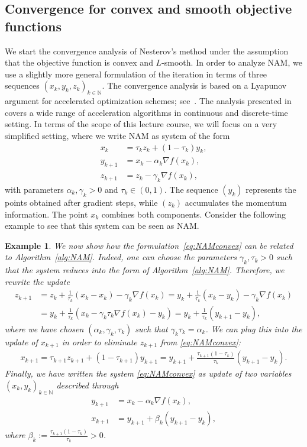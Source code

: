\documentclass[12pt,openany]{book}
\newtheorem{example}[thm]{Example}
\theoremstyle{definition}
\theoremstyle{definition}
\newcommand{\N}{\mathbb{N}}
\begin{document}
\subsection{Convergence for convex and smooth objective functions}\label{sec:NAM_convex}
We start the convergence analysis of Nesterov's method under the assumption that the objective
function is convex and $L$-smooth. In order to analyze NAM, we use a slightly more general formulation of the iteration in terms of three sequences $(x_k,y_k,z_k)_{k\in\mathbb N}$.
The convergence analysis is based on a Lyapunov argument for accelerated optimization schemes; see~\cite{Wilson2021}.
The analysis presented in \cite{Wilson2021} covers a wide range of acceleration algorithms in continuous and discrete-time setting. In terms of the scope of this lecture course, we will focus on a very simplified setting, where we write NAM as system of the form
\begin{equation}\label{eq:NAMconvex}
\begin{split}
x_k &= \tau_k z_k + (1-\tau_k) y_k,\\
y_{k+1} &= x_k - \alpha_k \nabla f(x_k),\\
z_{k+1} &= z_k - \gamma_k \nabla f(x_k),
\end{split}
\end{equation}
with parameters $\alpha_k, \gamma_k>0$ and $\tau_k\in(0,1)$. The sequence $(y_k)$ represents the points obtained after gradient steps, while $(z_k)$ accumulates the momentum information. The point $x_k$ combines both components.
Consider the following example to see that this system can be seen as NAM.
\begin{example}\label{ex:connectionthreevar}  
We now show how the formulation~\eqref{eq:NAMconvex} can be related to Algorithm~\ref{alg:NAM}. Indeed, one can choose the parameters $\gamma_k,\tau_k>0$ such that the system reduces into the form of Algorithm~\ref{alg:NAM}. Therefore, we rewrite the update 
\begin{align*}
z_{k+1}& = z_k + \frac{1}{\tau_k}(x_k-x_k) - \gamma_k\nabla f(x_k)=y_k + \frac{1}{\tau_k}(x_k-y_k) -\gamma_k \nabla f(x_k)\\
&=y_k + \frac{1}{\tau_k} (x_k-\gamma_k \tau_k \nabla f(x_k) - y_k)= y_k+ \frac{1}{\tau_k} (y_{k+1}-y_k),
\end{align*}
where we have chosen $(\alpha_k,\gamma_k,\tau_k)$ such that $\gamma_k \tau_k = \alpha_k$. We can plug this into the update of $x_{k+1}$ in order to eliminate $z_{k+1}$ from \eqref{eq:NAMconvex}: 
\begin{align*}
x_{k+1} = \tau_{k+1} z_{k+1} + (1-\tau_{k+1}) y_{k+1} = y_{k+1} + \frac{\tau_{k+1}(1-\tau_k)}{\tau_k} (y_{k+1}-y_k).
\end{align*}
Finally, we have written the system \eqref{eq:NAMconvex} as update of two variables $(x_k,y_k)_{k\in\N}$ described through
\begin{align*}
y_{k+1} &= x_k - \alpha_k \nabla f(x_k),\\
x_{k+1} &= y_{k+1} + \beta_k (y_{k+1}-y_k),
\end{align*}
where $\beta_k := \frac{\tau_{k+1}(1-\tau_k)}{\tau_k}>0$.
\end{example} 
\end{document}
